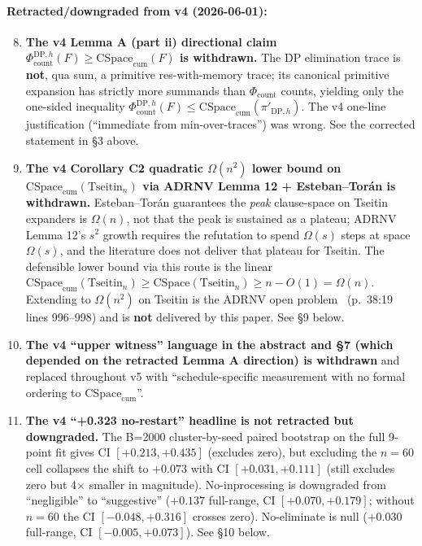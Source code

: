 \documentclass[11pt,a4paper]{article}
\theoremstyle{remark}
\begin{document}
\paragraph{Retracted/downgraded from v4 (2026-06-01):}
\begin{enumerate}\setcounter{enumi}{7}
\item \textbf{The v4 Lemma A (part ii) directional claim
$\Phi_{\mathrm{count}}^{\mathrm{DP},h}(F) \ge
\mathrm{CSpace}_{\mathrm{cum}}(F)$ is withdrawn.} The DP elimination trace
is \textbf{not}, qua sum, a primitive res-with-memory trace; its canonical
primitive expansion has strictly more summands than $\Phi_{\mathrm{count}}$
counts, yielding only the one-sided inequality
$\Phi_{\mathrm{count}}^{\mathrm{DP},h}(F) \le
\mathrm{CSpace}_{\mathrm{cum}}(\pi'_{\mathrm{DP},h})$. The v4 one-line
justification (``immediate from min-over-traces'') was wrong. See the
corrected statement in \S3 above.

\item \textbf{The v4 Corollary C2 quadratic $\Omega(n^2)$ lower bound on
$\mathrm{CSpace}_{\mathrm{cum}}(\mathrm{Tseitin}_n)$ via ADRNV Lemma 12
+ Esteban--Tor\'an is withdrawn.} Esteban--Tor\'an guarantees the
\emph{peak} clause-space on Tseitin expanders is $\Omega(n)$, not that
the peak is sustained as a plateau; ADRNV Lemma 12's $s^2$ growth
requires the refutation to spend $\Omega(s)$ steps at space $\Omega(s)$,
and the literature does not deliver that plateau for Tseitin. The
defensible lower bound via this route is the linear
$\mathrm{CSpace}_{\mathrm{cum}}(\mathrm{Tseitin}_n) \ge
\mathrm{CSpace}(\mathrm{Tseitin}_n) \ge n - O(1) = \Omega(n)$. Extending
to $\Omega(n^2)$ on Tseitin is the ADRNV open
problem~\cite{ADRNV2017} (p.~38:19 lines 996--998) and is \textbf{not}
delivered by this paper. See \S9 below.

\item \textbf{The v4 ``upper witness'' language in the abstract and \S7
(which depended on the retracted Lemma A direction) is withdrawn} and
replaced throughout v5 with ``schedule-specific measurement with no formal
ordering to $\mathrm{CSpace}_{\mathrm{cum}}$''.

\item \textbf{The v4 ``+0.323 no-restart'' headline is not retracted but
downgraded.} The B=2000 cluster-by-seed paired bootstrap on the full
9-point fit gives CI $[+0.213, +0.435]$ (excludes zero), but excluding the
$n=60$ cell collapses the shift to $+0.073$ with CI $[+0.031, +0.111]$
(still excludes zero but 4$\times$ smaller in magnitude). No-inprocessing
is downgraded from ``negligible'' to ``suggestive'' ($+0.137$ full-range,
CI $[+0.070, +0.179]$; without $n=60$ the CI $[-0.048, +0.316]$ crosses
zero). No-eliminate is null ($+0.030$ full-range, CI $[-0.005, +0.073]$).
See \S10 below.
\end{enumerate}
\end{document}
